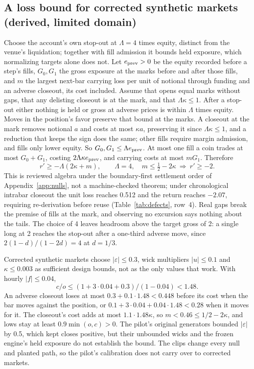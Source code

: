 \documentclass[11pt]{article}
\begin{document}
\subsection{A loss bound for corrected synthetic markets (derived, limited domain)}\label{app:loss}

Choose the account's own stop-out at $\Lambda=4$ times equity, distinct from the venue's liquidation; together with fill admission it bounds held exposure, which normalizing targets alone does not. Let $e_{\rm prev}>0$ be the equity recorded before a step's fills, $G_0,G_1$ the gross exposure at the marks before and after those fills, and $m$ the largest next-bar carrying loss per unit of notional through funding and an adverse closeout, its cost included. Assume that opens equal marks without gaps, that any delisting closeout is at the mark, and that $\Lambda\kappa\le1$. After a stop-out either nothing is held or gross at adverse prices is within $\Lambda$ times equity. Moves in the position's favor preserve that bound at the marks. A closeout at the mark removes notional $a$ and costs at most $\kappa a$, preserving it since $\Lambda\kappa\le1$, and a reduction that keeps the sign does the same; other fills require margin admission, and fills only lower equity. So $G_0,G_1\le\Lambda e_{\rm prev}$. At most one fill a coin trades at most $G_0+G_1$, costing $2\Lambda\kappa e_{\rm prev}$, and carrying costs at most $mG_1$. Therefore
\[
 r'\ge-\Lambda(2\kappa+m),\qquad
 \Lambda=4,\quad m\le\tfrac12-2\kappa\ \Longrightarrow\ r'\ge-2.
\]
This is reviewed algebra under the boundary-first settlement order of Appendix~\ref{app:nulls}, not a machine-checked theorem; under chronological intrabar closeout the unit loss reaches 0.512 and the return reaches $-2.07$, requiring re-derivation before reuse (Table~\ref{tab:defects}, row~4). Real gaps break the premise of fills at the mark, and observing no excursion says nothing about the tails. The choice of 4 leaves headroom above the target gross of 2: a single long at 2 reaches the stop-out after a one-third adverse move, since $2(1-d)/(1-2d)=4$ at $d=1/3$.

Corrected synthetic markets choose $|\varepsilon|\le0.3$, wick multipliers $|u|\le0.1$ and $\kappa\le0.003$ as sufficient design bounds, not as the only values that work. With hourly $|f|\le0.04$,
\[
 c/o\le(1+3\cdot0.04+0.3)/(1-0.04)<1.48.
\]
An adverse closeout loses at most $0.3+0.1\cdot1.48<0.448$ before its cost when the bar moves against the position, or $0.1+3\cdot0.04+0.04\cdot1.48<0.28$ when it moves for it. The closeout's cost adds at most $1.1\cdot1.48\kappa$, so $m<0.46\le1/2-2\kappa$, and lows stay at least $0.9\min(o,c)>0$. The pilot's original generators bounded $|\varepsilon|$ by 0.5, which kept closes positive, but their unbounded wicks and the frozen engine's held exposure do not establish the bound. The clips change every null and planted path, so the pilot's calibration does not carry over to corrected markets.
\end{document}
